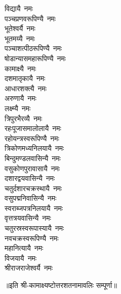 \begin{multicols}{2}
\begin{flushleft}
विद्यायै~नमः\\
पञ्चप्रणवरूपिण्यै~नमः\\
भूतेश्वर्यै~नमः\\
भूतमय्यै~नमः\\
पञ्चाशत्पीठरूपिण्यै~नमः\\
षोडान्यास\-महा\-रूपि\-ण्यै~नमः\\
कामाक्ष्यै~नमः\\
दशमातृकायै~नमः\\
आधारशक्त्यै~नमः \hfill{}\\
अरुणायै~नमः\\
लक्ष्म्यै~नमः\\
त्रिपुरभैरव्यै~नमः\\
रहःपूजासमालोलायै~नमः\\
रहोयन्त्रस्वरूपिण्यै~नमः\\
त्रिकोणमध्यनिलयायै~नमः\\
बिन्दुमण्डल\-वासि\-न्यै~नमः\\
वसुकोणपुरा\-वासायै~नमः\\
दशारद्वयवासिन्यै~नमः\\
चतुर्दशारचक्रस्थायै~नमः \hfill{}\\
वसुपद्मनिवासिन्यै~नमः\\
स्वराब्जपत्रनिलयायै~नमः\\
वृत्तत्रयवासिन्यै~नमः\\
चतुरस्रस्वरूपास्यायै~नमः\\
नवचक्रस्वरूपिण्यै~नमः\\
महानित्यायै~नमः\\
विजयायै~नमः\\
श्रीराजराजेश्वर्यै~नमः \hfill{}\\
\end{flushleft}
\end{multicols}
॥इति श्री-कामाक्ष्यष्टोत्तरशतनामावलिः सम्पूर्णा॥
